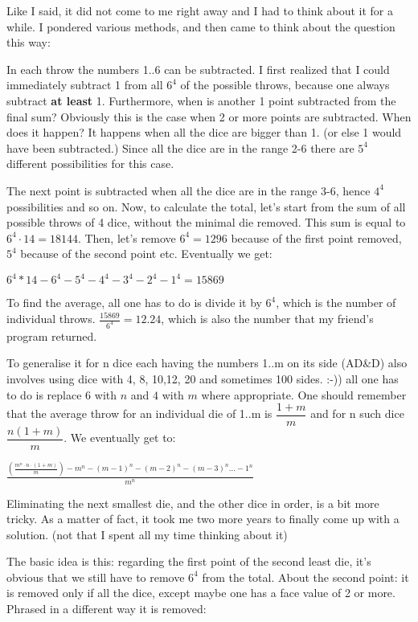 \documentclass[a4paper]{article}
\begin{document}
Like I said, it did not come to me right away and I had to think about it
for a while. I pondered various methods, and then came to think about the
question this way:

In each throw the numbers 1..6 can be subtracted. I first realized that I
could immediately subtract 1 from all $ 6^4 $ of the possible throws, because
one always subtract {\bf at least} 1. Furthermore, when is another 1 point
subtracted from the final sum? Obviously this is the case when 2 or more
points are subtracted. When does it happen? It happens when all the dice
are bigger than 1. (or else 1 would have been subtracted.) Since all the
dice are in the range 2-6 there are $5^4$ different possibilities for this
case.

The next point is subtracted when all the dice are in the range 3-6, hence
$4^4$ possibilities and so on. Now, to calculate the total, let's start from
the sum of all possible throws of 4 dice, without the minimal die removed.
This sum is equal to $6^4 \cdot 14 = 18144$. Then, let's remove $6^4 = 1296$
because of the first point removed, $5^4$ because of the second point etc.
Eventually we get:

$6^4 * 14 - 6^4 - 5^4 - 4^4 - 3^4 - 2^4 - 1^4 = 15869$

To find the average, all one has to do is divide it by $6^4$, which is the
number of individual throws. $\frac{15869}{6^4} = 12.24$, which is also the
number that my friend's program returned.

To generalise it for n dice each having the numbers 1..m on its side
(AD\&D) also involves using dice with 4, 8, 10,12, 20 and sometimes 100
sides. :-)) all one has to do is replace $6$ with $n$ and $4$ with $m$
where  appropriate. One should remember that the average throw for an
individual die of 1..m is $\dfrac{1+m}{m} $ and for n such dice
$\dfrac{n\left(1+m\right)}{m}$. We eventually get to:

$
\frac{\left( \frac{m^n \cdot n \cdot \left(1+m\right)}{m} \right) - m^n -
\left(m-1\right)^n - \left(m-2\right)^n - \left(m-3\right)^n ... - 1^n}{m ^ n}
$

Eliminating the next smallest die, and the other dice in order, is a bit
more tricky. As a matter of fact, it took me two more years to finally come
up with a solution. (not that I spent all my time thinking about it)

The basic idea is this: regarding the first point of the second least die,
it's obvious that we still have to remove $6^4$ from the total. About the
second point: it is removed only if all the dice, except maybe one has a
face value of 2 or more. Phrased in a different way it is removed:
\end{document}
